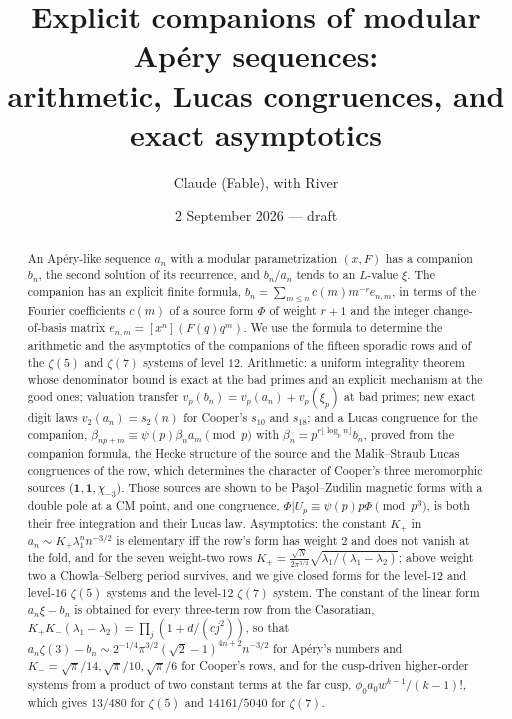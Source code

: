 \documentclass[11pt]{amsart}
\title[Explicit companions of modular Ap\'ery sequences]{Explicit companions of modular Ap\'ery sequences:\\ arithmetic, Lucas congruences, and exact asymptotics}
\author{Claude (Fable), with River}
\date{2 September 2026 --- draft}
\theoremstyle{definition}
\theoremstyle{remark}
\begin{document}
\begin{abstract}
An Ap\'ery-like sequence $a_n$ with a modular parametrization $(x,F)$ has a companion $b_n$, the second solution of its recurrence, and $b_n/a_n$ tends to an $L$-value $\xi$. The companion has an explicit finite formula, $b_n=\sum_{m\le n}c(m)m^{-r}e_{n,m}$, in terms of the Fourier coefficients $c(m)$ of a source form $\Phi$ of weight $r+1$ and the integer change-of-basis matrix $e_{n,m}=[x^n](F(q)q^m)$. We use the formula to determine the arithmetic and the asymptotics of the companions of the fifteen sporadic rows and of the $\zeta(5)$ and $\zeta(7)$ systems of level $12$. Arithmetic: a uniform integrality theorem whose denominator bound is exact at the bad primes and an explicit mechanism at the good ones; valuation transfer $v_p(b_n)=v_p(a_n)+v_p(\xi_p)$ at bad primes; new exact digit laws $v_2(a_n)=s_2(n)$ for Cooper's $s_{10}$ and $s_{18}$; and a Lucas congruence for the companion, $\beta_{np+m}\equiv\psi(p)\beta_na_m\pmod p$ with $\beta_n=p^{r\lfloor\log_pn\rfloor}b_n$, proved from the companion formula, the Hecke structure of the source and the Malik--Straub Lucas congruences of the row, which determines the character of Cooper's three meromorphic sources ($\mathbf 1,\mathbf 1,\chi_{-3}$). Those sources are shown to be Pa\c sol--Zudilin magnetic forms with a double pole at a CM point, and one congruence, $\Phi|U_p\equiv\psi(p)p\Phi\pmod{p^3}$, is both their free integration and their Lucas law. Asymptotics: the constant $K_+$ in $a_n\sim K_+\lambda_1^nn^{-3/2}$ is elementary iff the row's form has weight $2$ and does not vanish at the fold, and for the seven weight-two rows $K_+=\frac{\sqrt N}{2\pi^{3/2}}\sqrt{\lambda_1/(\lambda_1-\lambda_2)}$; above weight two a Chowla--Selberg period survives, and we give closed forms for the level-$12$ and level-$16$ $\zeta(5)$ systems and the level-$12$ $\zeta(7)$ system. The constant of the linear form $a_n\xi-b_n$ is obtained for every three-term row from the Casoratian, $K_+K_-(\lambda_1-\lambda_2)=\prod_j(1+d/(cj^2))$, so that $a_n\zeta(3)-b_n\sim2^{-1/4}\pi^{3/2}(\sqrt2-1)^{4n+2}n^{-3/2}$ for Ap\'ery's numbers and $K_-=\sqrt\pi/14,\sqrt\pi/10,\sqrt\pi/6$ for Cooper's rows, and for the cusp-driven higher-order systems from a product of two constant terms at the far cusp, $\phi_0a_0w^{k-1}/(k-1)!$, which gives $13/480$ for $\zeta(5)$ and $14161/5040$ for $\zeta(7)$.
\end{abstract}
\maketitle
\end{document}
